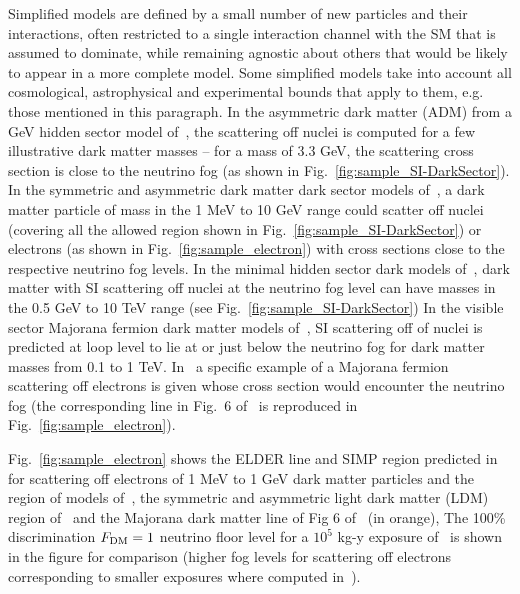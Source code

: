  
Simplified models are defined by a small number of new particles and their interactions, often restricted to a single interaction channel with the SM that is assumed to dominate, while remaining agnostic about others that would be likely to appear in a more complete model.  Some simplified models take into account all cosmological, astrophysical and experimental bounds that apply to them, e.g. those mentioned in this paragraph. 
In the asymmetric dark matter (ADM) from a GeV hidden sector model of~\cite{Cohen:2010kn}, the scattering off nuclei is computed for a few illustrative dark matter  masses -- for a mass of 3.3 GeV, the scattering cross section is close to the neutrino fog (as shown in Fig.~\ref{fig:sample_SI-DarkSector}). 
 In the symmetric and asymmetric dark matter dark sector models of~\cite{Lin:2011gj}, a dark matter particle of mass in the 1 MeV to 10 GeV range could scatter off nuclei (covering all the allowed region shown in Fig.~\ref{fig:sample_SI-DarkSector}) or electrons (as shown in Fig.~\ref{fig:sample_electron})  with cross sections close to the respective neutrino fog levels. 
 In the minimal hidden sector dark models of~\cite{Evans:2017kti}, dark matter with SI scattering off nuclei at the neutrino fog level can have masses in the 0.5 GeV to 10 TeV range (see Fig.~\ref{fig:sample_SI-DarkSector})
In the visible sector Majorana fermion dark matter models of~\cite{Berlin:2015ymu}, SI scattering off of nuclei is predicted at loop level to lie at or just below the neutrino fog for dark matter masses from 0.1 to 1 TeV. 
In~\cite{Battaglieri:2017aum}  a specific example of a Majorana fermion scattering off electrons is given whose cross section  would encounter the neutrino fog (the corresponding line in Fig.~6 of~\cite{Battaglieri:2017aum} is reproduced in Fig.~\ref{fig:sample_electron}).

 
 
  Fig.~\ref{fig:sample_electron}  shows the ELDER line and SIMP region predicted in~\cite{Kuflik:2017iqs} for scattering off electrons of 1 MeV to 1 GeV dark matter particles and the region of models of~\cite{Lin:2011gj}, the symmetric and asymmetric light dark matter (LDM) region of~\cite{Lin:2011gj} and the Majorana dark matter line of Fig 6 of~\cite{Battaglieri:2017aum} (in orange),   The 100\% discrimination $F_{\rm DM } = 1$ neutrino floor level for a $10^5$ kg-y exposure of~\cite{Wyenberg:2018eyv} is shown in the figure for comparison (higher fog levels for scattering off electrons corresponding to smaller exposures where computed in~\cite{Essig:2018tss}).


